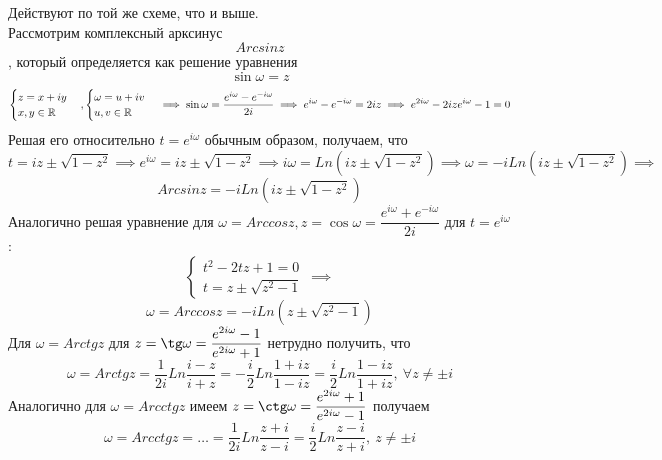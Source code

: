 \documentclass[../../main.tex]{subfiles}
\begin{document}
Действуют по той же схеме, что и выше.\\
Рассмотрим комплексный арксинус
\begin{equation}
\label{lec27:23}
Arcsin z
\end{equation}, который определяется как решение уравнения
\begin{equation}
\label{lec27:24}
\sin \omega = z
\end{equation}
\[
\begin{cases}
	z = x + iy\\
	x, y \in \mathbb{R}
\end{cases},
\begin{cases}
	\omega = u + iv\\
	u, v \in \mathbb{R}
\end{cases} \implies
\sin \omega = \dfrac{e^{i\omega} - e^{-i\omega}}{2i} \implies
e^{i\omega} - e^{-i\omega} = 2iz \implies
e^{2i\omega} - 2ize^{i\omega} - 1 = 0
\]
Решая его относительно $ t = e^{i\omega} $ обычным образом, получаем, что
\[
t = iz \pm \sqrt{1 - z^2} \implies
e^{i\omega} = iz \pm \sqrt{1 - z^2} \implies
i\omega = Ln(iz \pm \sqrt{1 - z^2}) \implies
\omega = -iLn(iz \pm \sqrt{1 - z^2}) \implies
\]
\begin{equation}
\label{lec27:25}
Arcsin z = -iLn(iz\pm\sqrt{1 - z^2})
\end{equation}
Аналогично решая уравнение для $ \omega = Arccos z, z = \cos \omega = 
\dfrac{e^{i\omega} + e^{-i\omega}}{2i} $ для $ t = e^{i\omega} $:
\[
\begin{cases}
	t^2 - 2tz + 1 = 0 \\
	t = z \pm \sqrt{z^2 - 1}
\end{cases} \implies
\] 
\begin{equation}
\label{lec27:26}
\omega = Arccos z = -iLn(z \pm \sqrt{z^2 - 1})
\end{equation}
Для $ \omega = Arctg z $ для $ z = \tg \omega = 
\dfrac{e^{2i\omega} - 1}{e^{2i\omega} + 1} $ нетрудно получить, что 
\begin{equation}
\label{lec27:27}
\omega = Arctg z = \dfrac{1}{2i} Ln \dfrac{i - z}{i + z} = 
-\dfrac{i}{2} Ln\dfrac{1 + iz}{1 - iz} = 
\dfrac{i}{2} Ln\dfrac{1 - iz}{1 + iz},\ \forall z \neq \pm i
\end{equation}
Аналогично для $ \omega = Arcctg z $ имеем $ z = \ctg \omega = 
\dfrac{e^{2i\omega} + 1}{e^{2i\omega} - 1} $ получаем
\begin{equation}
\label{lec27:28}
\omega = Arcctg z = \dots = \dfrac{1}{2i} Ln \dfrac{z + i}{z - i} = 
\dfrac{i}{2} Ln \dfrac{z - i}{z + i},\ z \neq \pm i
\end{equation}
\end{document}
